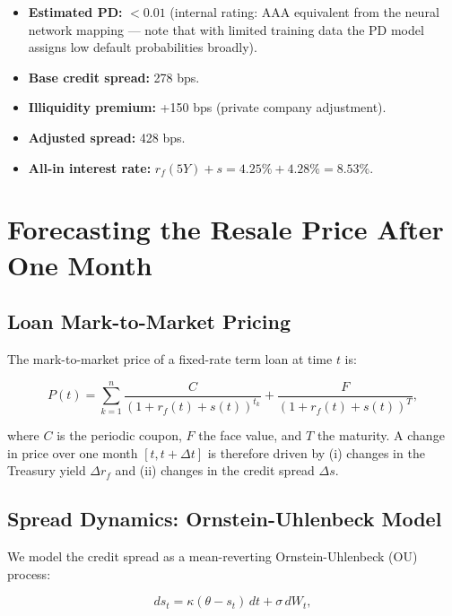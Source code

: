 \documentclass[12pt, a4paper]{article}
\theoremstyle{definition}
\begin{document}
\begin{itemize}
  \item \textbf{Estimated PD:} $< 0.01$ (internal rating: AAA equivalent from the
    neural network mapping --- note that with limited training data the PD model
    assigns low default probabilities broadly).
  \item \textbf{Base credit spread:} 278 bps.
  \item \textbf{Illiquidity premium:} +150 bps (private company adjustment).
  \item \textbf{Adjusted spread:} 428 bps.
  \item \textbf{All-in interest rate:} $r_f(5Y) + s = 4.25\% + 4.28\% = 8.53\%$.
\end{itemize}

\section{Forecasting the Resale Price After One Month}
\label{sec:forecast}

\subsection{Loan Mark-to-Market Pricing}

The mark-to-market price of a fixed-rate term loan at time $t$ is:

\begin{equation}
  P(t) = \sum_{k=1}^{n} \frac{C}{(1 + r_f(t) + s(t))^{t_k}} + \frac{F}{(1 + r_f(t) + s(t))^{T}},
\end{equation}

where $C$ is the periodic coupon, $F$ the face value, and $T$ the maturity.
A change in price over one month $[t, t+\Delta t]$ is therefore driven by
(i) changes in the Treasury yield $\Delta r_f$ and
(ii) changes in the credit spread $\Delta s$.

\subsection{Spread Dynamics: Ornstein-Uhlenbeck Model}

We model the credit spread as a mean-reverting Ornstein-Uhlenbeck (OU) process:

\begin{equation}
  ds_t = \kappa(\theta - s_t)\,dt + \sigma\,dW_t,
  \label{eq:ou}
\end{equation}
\end{document}
